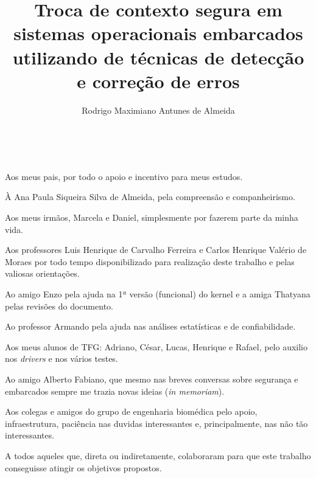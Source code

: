 \documentclass[12pt,openright,oneside,a4paper,brazil]{abntex2}
\title{Troca de contexto segura em sistemas operacionais embarcados utilizando de técnicas de detecção e correção de erros}
\author{Rodrigo Maximiano Antunes de Almeida}
\begin{document}
\imprimircapa
\imprimirfolhaderosto



\begin{agradecimentos}
~

\indent{}Aos meus pais, por todo o apoio e incentivo para meus estudos.

À Ana Paula Siqueira Silva de Almeida, pela compreensão e companheirismo.

Aos meus irmãos, Marcela e Daniel, simplesmente por fazerem parte da minha vida.

Aos professores Luis Henrique de Carvalho Ferreira e Carlos Henrique Valério de Moraes por todo tempo disponibilizado para realização deste trabalho e pelas valiosas orientações.

Ao amigo Enzo pela ajuda na 1ª versão (funcional) do kernel e a amiga Thatyana pelas revisões do documento.

Ao professor Armando pela ajuda nas análises estatísticas e de confiabilidade.

Aos meus alunos de TFG: Adriano, César, Lucas, Henrique e Rafael, pelo auxilio nos \textit{drivers} e nos vários testes.

Ao amigo Alberto Fabiano, que mesmo nas breves conversas sobre segurança e embarcados sempre me trazia novas ideias (\scriptsize{\textit{in memoriam}}\normalsize).

Aos colegas e amigos do grupo de engenharia biomédica pelo apoio, infraestrutura, paciência nas duvidas interessantes e, principalmente, nas não tão interessantes.

A todos aqueles que, direta ou indiretamente, colaboraram para que este trabalho conseguisse atingir os objetivos propostos.
\end{agradecimentos}
\end{document}
